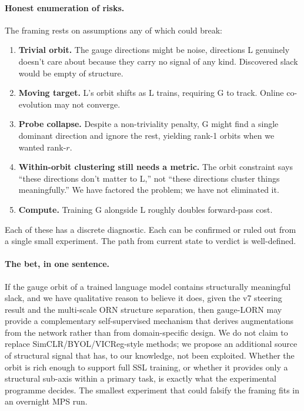 \documentclass[11pt, a4paper]{article}
\theoremstyle{plain}
\theoremstyle{definition}
\theoremstyle{remark}
\begin{document}
\paragraph{Honest enumeration of risks.}
The framing rests on assumptions any of which could break:
\begin{enumerate}[nosep]
\item \textbf{Trivial orbit.} The gauge directions might be noise, directions L genuinely doesn't care about because they carry no signal of any kind. Discovered slack would be empty of structure.
\item \textbf{Moving target.} L's orbit shifts as L trains, requiring G to track. Online co-evolution may not converge.
\item \textbf{Probe collapse.} Despite a non-triviality penalty, G might find a single dominant direction and ignore the rest, yielding rank-1 orbits when we wanted rank-$r$.
\item \textbf{Within-orbit clustering still needs a metric.} The orbit constraint says ``these directions don't matter to L,'' not ``these directions cluster things meaningfully.'' We have factored the problem; we have not eliminated it.
\item \textbf{Compute.} Training G alongside L roughly doubles forward-pass cost.
\end{enumerate}
Each of these has a discrete diagnostic. Each can be confirmed or ruled out from a single small experiment. The path from current state to verdict is well-defined.

\paragraph{The bet, in one sentence.}
If the gauge orbit of a trained language model contains structurally meaningful slack, and we have qualitative reason to believe it does, given the v7 steering result and the multi-scale ORN structure separation, then gauge-LORN may provide a complementary self-supervised mechanism that derives augmentations from the network rather than from domain-specific design.
We do not claim to replace SimCLR/BYOL/VICReg-style methods; we propose an additional source of structural signal that has, to our knowledge, not been exploited.
Whether the orbit is rich enough to support full SSL training, or whether it provides only a structural sub-axis within a primary task, is exactly what the experimental programme decides.
The smallest experiment that could falsify the framing fits in an overnight MPS run.
\end{document}

